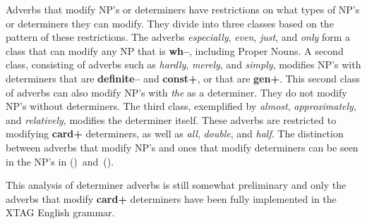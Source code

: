Adverbs that modify NP's or determiners have restrictions on what types of NP's
or determiners they can modify. They divide into three classes based on the
pattern of these restrictions.  The adverbs {\it especially}, {\it even}, {\it
just}, and {\it only} form a class that can modify any NP that is {\bf wh--},
including Proper Nouns.  A second class, consisting of adverbs such as {\it
hardly}, {\it merely}, and {\it simply}, modifies NP's with determiners that
are {\bf definite--} and {\bf const+}, or that are {\bf gen+}.  This second
class of adverbs can also modify NP's with {\it the} as a determiner.  They do
not modify NP's without determiners.  The third class, exemplified by {\it
almost}, {\it approximately}, and {\it relatively}, modifies the determiner
itself.  These adverbs are restricted to modifying {\bf card+} determiners, as
well as {\it all}, {\it double}, and {\it half}.  The distinction between
adverbs that modify NP's and ones that modify determiners can be seen in the
NP's in ({})~and~({}).


This analysis of determiner adverbs is still somewhat preliminary and
only the adverbs that modify {\bf card+} determiners have been fully
implemented in the XTAG English grammar.



